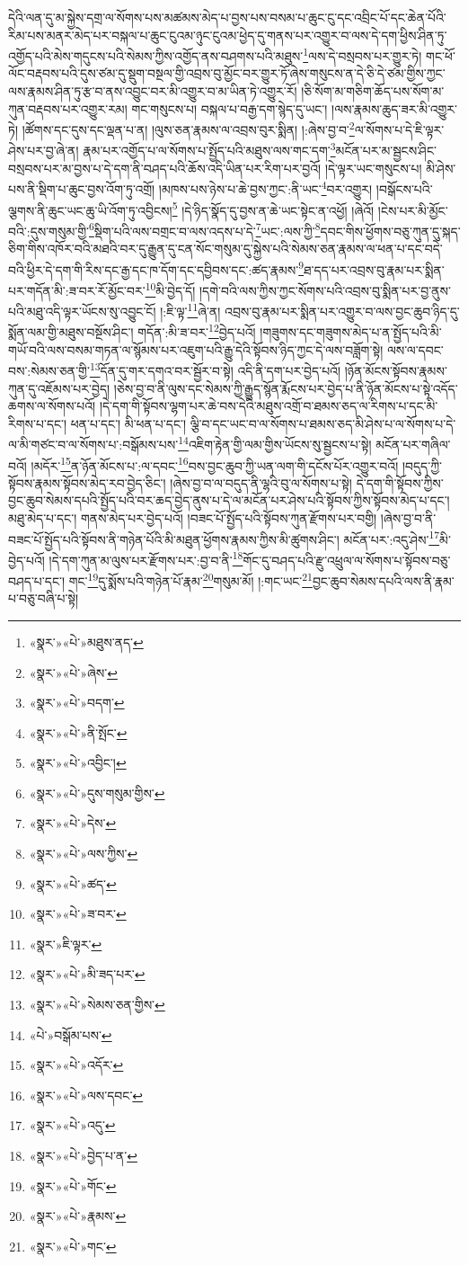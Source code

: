 དེའི་ལན་དུ་མ་སྐྱེས་དགྲ་ལ་སོགས་པས་མཚམས་མེད་པ་བྱས་པས་བསམ་པ་ཆུང་ངུ་དང་འབྲིང་པོ་དང་ཆེན་པོའི་རིམ་པས་མནར་མེད་པར་བསྐལ་པ་ཆུང་ངུའམ་ཉུང་ངུའམ་ཕྱེད་དུ་གནས་པར་འགྱུར་བ་ལས་དེ་དག་ཕྱིས་ཤིན་ཏུ་འགྱོད་པའི་མེས་གདུངས་པའི་སེམས་ཀྱིས་འགྱོད་ནས་བཤགས་པའི་མཐུས་\footnote{«སྣར་»«པེ་»མཐུས་ནད་}ལས་དེ་བསྲབས་པར་གྱུར་ཏེ། གང་ཕོ་ལོང་བརྡབས་པའི་དུས་ཙམ་དུ་སྡུག་བསྔལ་གྱི་འབྲས་བུ་མྱོང་བར་གྱུར་ཏོ་ཞེས་གསུངས་ན་དེ་ཅི་དེ་ཙམ་གྱིས་ཀྱང་ལས་རྣམས་ཤིན་ཏུ་རྩ་བ་ནས་འབྱུང་བར་མི་འགྱུར་བ་མ་ཡིན་ཏེ་འགྱུར་རོ། །ཅི་སོག་མ་གཅིག་ཆོད་པས་སོག་མ་ཀུན་བརྡབས་པར་འགྱུར་རམ། གང་གསུངས་པ། བསྐལ་པ་བརྒྱ་དག་སྙེད་དུ་ཡང་། །ལས་རྣམས་ཆུད་ཟར་མི་འགྱུར་ཏེ། །ཚོགས་དང་དུས་དང་ལྡན་པ་ན། །ལུས་ཅན་རྣམས་ལ་འབྲས་བུར་སྨིན། །:ཞེས་བྱ་བ་\footnote{«སྣར་»«པེ་»ཞེས་}ལ་སོགས་པ་དེ་ཇི་ལྟར་ཤེས་པར་བྱ་ཞེ་ན། རྣམ་པར་འགྱོད་པ་ལ་སོགས་པ་སྤྱོད་པའི་མཐུས་ལས་གང་དག་\footnote{«སྣར་»«པེ་»བདག་}མངོན་པར་མ་སྦྱངས་ཤིང་བསྲབས་པར་མ་བྱས་པ་དེ་དག་ནི་བཤད་པའི་ཆོས་འདི་ཡིན་པར་རིག་པར་བྱའོ། །དེ་ལྟར་ཡང་གསུངས་པ། མི་ཤེས་པས་ནི་སྡིག་པ་ཆུང་བྱས་འོག་ཏུ་འགྲོ། །མཁས་པས་ཉེས་པ་ཆེ་བྱས་ཀྱང་:ནི་ཡང་\footnote{«སྣར་»«པེ་»ནི་སྤོང་}བར་འགྱུར། །བསྒོངས་པའི་ལྕགས་ནི་ཆུང་ཡང་ཆུ་ཡི་འོག་ཏུ་འབྱིངས།\footnote{«སྣར་»«པེ་»འབྱིང་།} །དེ་ཉིད་སྣོད་དུ་བྱས་ན་ཆེ་ཡང་སྟེང་ན་འཕྱོ། །ཞེའོ། །ངེས་པར་མི་མྱོང་བའི་:དུས་གསུམ་གྱི་\footnote{«སྣར་»«པེ་»དུས་གསུམ་གྱིས་}སྡིག་པའི་ལས་བགྲང་བ་ལས་འདས་པ་དེ་\footnote{«སྣར་»«པེ་»དེས་}ཡང་:ལས་ཀྱི་\footnote{«སྣར་»«པེ་»ལས་ཀྱིས་}དབང་གིས་ཕྱོགས་བཅུ་ཀུན་དུ་སྐད་ཅིག་གིས་འཁོར་བའི་མཐའི་བར་དུ་རྒྱུན་དུ་ངན་སོང་གསུམ་དུ་སྐྱེས་པའི་སེམས་ཅན་རྣམས་ལ་ཕན་པ་དང་བདེ་བའི་ཕྱིར་དེ་དག་གི་རིས་དང་རྒྱ་དང་ཁ་དོག་དང་དབྱིབས་དང་:ཚད་རྣམས་\footnote{«སྣར་»«པེ་»ཚད་}ཐ་དད་པར་འབྲས་བུ་རྣམ་པར་སྨིན་པར་གདོན་མི་:ཟ་བར་རོ་མྱོང་བར་\footnote{«སྣར་»«པེ་»ཟ་བར་}མི་བྱེད་དོ། །དགེ་བའི་ལས་ཀྱིས་ཀྱང་སོགས་པའི་འབྲས་བུ་སྨིན་པར་བྱ་ནུས་པའི་མཐུ་འདི་ལྟར་ཡོངས་སུ་འབྱུང་ངོ། །:ཇི་ལྟ་\footnote{«སྣར་»ཇི་ལྟར་}ཞེ་ན། འབྲས་བུ་རྣམ་པར་སྨིན་པར་འགྱུར་བ་ལས་བྱང་ཆུབ་ཉིད་དུ་སྨོན་ལམ་གྱི་མཐུས་བསྔོས་ཤིང་། གདོན་:མི་ཟ་བར་\footnote{«སྣར་»«པེ་»མི་ཟད་པར་}བྱེད་པའོ། །གཟུགས་དང་གཟུགས་མེད་པ་ན་སྤྱོད་པའི་མི་གཡོ་བའི་ལས་བསམ་གཏན་ལ་སྙོམས་པར་འཇུག་པའི་རྒྱུ་དེའི་སྟོབས་ཉིད་ཀྱང་དེ་ལས་བཟློག་སྟེ། ལས་ལ་དབང་བས་:སེམས་ཅན་གྱི་\footnote{«སྣར་»«པེ་»སེམས་ཅན་གྱིས་}དོན་དུ་གར་དགའ་བར་སྦྱོར་བ་སྟེ། འདི་ནི་དག་པར་བྱེད་པའོ། །ཉོན་མོངས་སྟོབས་རྣམས་ཀུན་དུ་འཇོམས་པར་བྱེད། །ཅེས་བྱ་བ་ནི་ལུས་དང་སེམས་ཀྱི་རྒྱུད་སྙོན་རྨོངས་པར་བྱེད་པ་ནི་ཉོན་མོངས་པ་སྟེ་འདོད་ཆགས་ལ་སོགས་པའོ། །དེ་དག་གི་སྟོབས་ལྷག་པར་ཆེ་བས་དེའི་མཐུས་འགྲོ་བ་ཐམས་ཅད་ལ་རིགས་པ་དང་མི་རིགས་པ་དང་། ཕན་པ་དང་། མི་ཕན་པ་དང་། ལྕི་བ་དང་ཡང་བ་ལ་སོགས་པ་ཐམས་ཅད་མི་ཤེས་པ་ལ་སོགས་པ་དེ་ལ་མི་གཙང་བ་ལ་སོགས་པ་:བསྒོམས་པས་\footnote{«པེ་»བསྒོམ་པས་}འཇིག་རྟེན་གྱི་ལམ་གྱིས་ཡོངས་སུ་སྦྱངས་པ་སྟེ། མངོན་པར་གཞིལ་བའོ། །མདོར་\footnote{«སྣར་»«པེ་»འདོར་}ན་ཉོན་མོངས་པ་:ལ་དབང་\footnote{«སྣར་»«པེ་»ལས་དབང་}བས་བྱང་ཆུབ་ཀྱི་ཡན་ལག་གི་དངོས་པོར་འགྱུར་བའོ། །བདུད་ཀྱི་སྟོབས་རྣམས་སྟོབས་མེད་རབ་བྱེད་ཅིང་། །ཞེས་བྱ་བ་ལ་བདུད་ནི་ལྷའི་བུ་ལ་སོགས་པ་སྟེ། དེ་དག་གི་སྟོབས་ཀྱིས་བྱང་ཆུབ་སེམས་དཔའི་སྤྱོད་པའི་བར་ཆད་བྱེད་ནུས་པ་དེ་ལ་མངོན་པར་ཤེས་པའི་སྟོབས་ཀྱིས་སྟོབས་མེད་པ་དང་། མཐུ་མེད་པ་དང་། གནས་མེད་པར་བྱེད་པའོ། །བཟང་པོ་སྤྱོད་པའི་སྟོབས་ཀུན་རྫོགས་པར་བགྱི། །ཞེས་བྱ་བ་ནི་བཟང་པོ་སྤྱོད་པའི་སྟོབས་ནི་གཉེན་པོའི་མི་མཐུན་ཕྱོགས་རྣམས་ཀྱིས་མི་ཚུགས་ཤིང་། མངོན་པར་:འདུ་ཤེས་\footnote{«སྣར་»«པེ་»འདུ་}མི་བྱེད་པའོ། །དེ་དག་ཀུན་མ་ལུས་པར་རྫོགས་པར་:བྱ་བ་ནི་\footnote{«སྣར་»«པེ་»བྱེད་པ་ན་}གོང་དུ་བཤད་པའི་རྫུ་འཕྲུལ་ལ་སོགས་པ་སྟོབས་བཅུ་བཤད་པ་དང་། གང་\footnote{«སྣར་»«པེ་»གོང་}དུ་སྨོས་པའི་གཉེན་པོ་རྣམ་\footnote{«སྣར་»«པེ་»རྣམས་}གསུམ་མོ། །:གང་ཡང་\footnote{«སྣར་»«པེ་»གང་}བྱང་ཆུབ་སེམས་དཔའི་ལས་ནི་རྣམ་པ་བཅུ་བཞི་པ་སྟེ། 